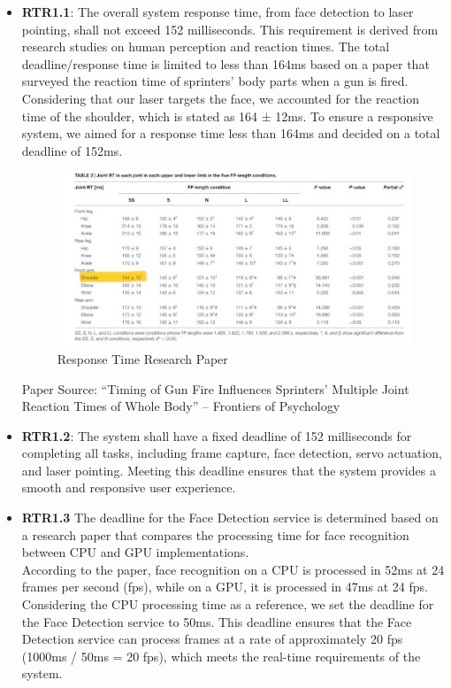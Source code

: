 \documentclass[a4paper,11pt]{article}%
\begin{document}
\begin{itemize}
    \item \textbf{RTR1.1}: The overall system response time, from face detection to laser pointing, shall not exceed 152 milliseconds. This requirement is derived from research studies on human perception and reaction times. The total deadline/response time is limited to less than 164ms based on a paper that surveyed the reaction time of sprinters' body parts when a gun is fired. Considering that our laser targets the face, we accounted for the reaction time of the shoulder, which is stated as 164 ± 12ms. To ensure a responsive system, we aimed for a response time less than 164ms and decided on a total deadline of 152ms.


          \begin{figure}[H]
              \centering
              \includegraphics[scale=0.8]{figures/face_detection_paper.png}
              \caption{Response Time Research Paper}
          \end{figure}

          Paper Source: “Timing of Gun Fire Influences Sprinters’ Multiple Joint Reaction Times of Whole Body” – Frontiers of Psychology


    \item \textbf{RTR1.2}: The system shall have a fixed deadline of 152 milliseconds for completing all tasks, including frame capture, face detection, servo actuation, and laser pointing. Meeting this deadline ensures that the system provides a smooth and responsive user experience.
    \item \textbf{RTR1.3}  The deadline for the Face Detection service is determined based on a research paper that compares the processing time for face recognition between CPU and GPU implementations.\\
          According to the paper, face recognition on a CPU is processed in 52ms at 24 frames per second (fps), while on a GPU, it is processed in 47ms at 24 fps.\\
          Considering the CPU processing time as a reference, we set the deadline for the Face Detection service to 50ms.
          This deadline ensures that the Face Detection service can process frames at a rate of approximately 20 fps (1000ms / 50ms = 20 fps), which meets the real-time requirements of the system.


\end{itemize}
\end{document}
